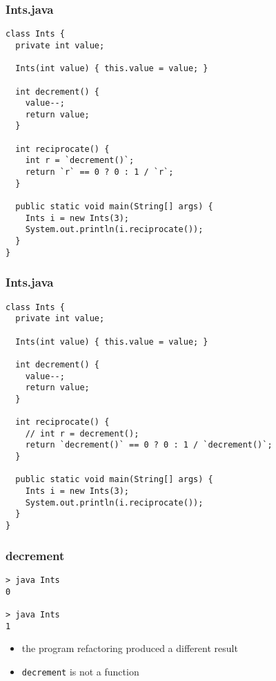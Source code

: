\begin{frame}[fragile]
\frametitle{Ints.java}
\begin{lstlisting}[style=java]
class Ints {
  private int value;

  Ints(int value) { this.value = value; }

  int decrement() {
    value--;
    return value;
  }

  int reciprocate() {
    int r = `decrement()`;
    return `r` == 0 ? 0 : 1 / `r`;
  }

  public static void main(String[] args) {
    Ints i = new Ints(3);
    System.out.println(i.reciprocate());
  }
}
\end{lstlisting}
\end{frame}

\begin{frame}[fragile]
\frametitle{Ints.java}
\begin{lstlisting}[style=java]
class Ints {
  private int value;

  Ints(int value) { this.value = value; }

  int decrement() {
    value--;
    return value;
  }

  int reciprocate() {
    // int r = decrement();
    return `decrement()` == 0 ? 0 : 1 / `decrement()`;
  }

  public static void main(String[] args) {
    Ints i = new Ints(3);
    System.out.println(i.reciprocate());
  }
}
\end{lstlisting}
\end{frame}

\begin{frame}[fragile]
\frametitle{decrement}
\begin{block}{}
\begin{lstlisting}
> java Ints
0

> java Ints
1
\end{lstlisting}
\end{block}
\begin{itemize}
  \item<1> the program refactoring produced a different result
  \item<2> \lstinline$decrement$ is not a function
\end{itemize}
\end{frame}

